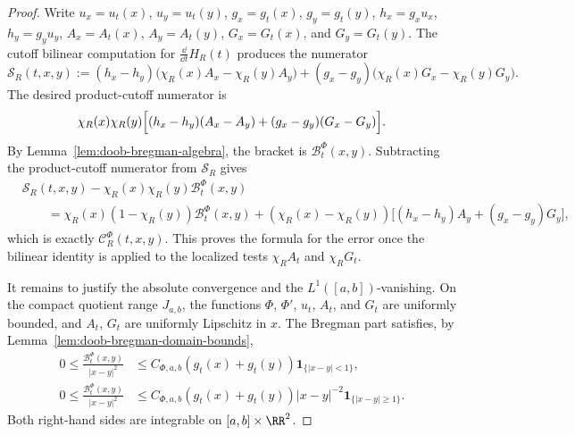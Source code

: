 \begin{proof}
Write \(u_x=u_t(x)\), \(u_y=u_t(y)\), \(g_x=g_t(x)\),
\(g_y=g_t(y)\), \(h_x=g_xu_x\), \(h_y=g_yu_y\),
\(A_x=A_t(x)\), \(A_y=A_t(y)\), \(G_x=G_t(x)\), and \(G_y=G_t(y)\).
The cutoff bilinear computation for
\(\frac{\dd}{\dd t}H_R(t)\) produces the numerator
\[
\mathcal S_R(t,x,y)
:=
(h_x-h_y)\bigl(\chi_R(x)A_x-\chi_R(y)A_y\bigr)
+(g_x-g_y)\bigl(\chi_R(x)G_x-\chi_R(y)G_y\bigr).
\]
The desired product-cutoff numerator is
\[
\chi_R(x)\chi_R(y)
\Bigl[(h_x-h_y)(A_x-A_y)+(g_x-g_y)(G_x-G_y)\Bigr].
\]
By Lemma~\ref{lem:doob-bregman-algebra}, the bracket is
\(\mathcal B_t^\Phi(x,y)\).  Subtracting the product-cutoff numerator from
\(\mathcal S_R\) gives
\[
\begin{split}
&\mathcal S_R(t,x,y)-\chi_R(x)\chi_R(y)\mathcal B_t^\Phi(x,y)\\
&\qquad=
\chi_R(x)(1-\chi_R(y))\mathcal B_t^\Phi(x,y)
+(\chi_R(x)-\chi_R(y))
\bigl[(h_x-h_y)A_y+(g_x-g_y)G_y\bigr],
\end{split}
\]
which is exactly \(\mathcal C_R^\Phi(t,x,y)\).  This proves the formula for
the error once the bilinear identity is applied to the localized tests
\(\chi_R A_t\) and \(\chi_R G_t\).

It remains to justify the absolute convergence and the
\(L^1([a,b])\)-vanishing.  On the compact quotient range \(J_{a,b}\), the
functions \(\Phi\), \(\Phi'\), \(u_t\), \(A_t\), and \(G_t\) are uniformly
bounded, and \(A_t\), \(G_t\) are uniformly Lipschitz in \(x\).  The Bregman
part satisfies, by Lemma~\ref{lem:doob-bregman-domain-bounds},
\begin{align}
0\le \frac{\mathcal B_t^\Phi(x,y)}{|x-y|^2}
&\le C_{\Phi,a,b}(g_t(x)+g_t(y))\mathbf 1_{\{|x-y|<1\}},
\label{eq:phi-commutator-near-bregman-bound}\\
0\le \frac{\mathcal B_t^\Phi(x,y)}{|x-y|^2}
&\le C_{\Phi,a,b}(g_t(x)+g_t(y))|x-y|^{-2}
\mathbf 1_{\{|x-y|\ge1\}} .
\label{eq:phi-commutator-far-bregman-bound}
\end{align}
Both right-hand sides are integrable on
\([a,b]\times\RR^2\).


\end{proof}
